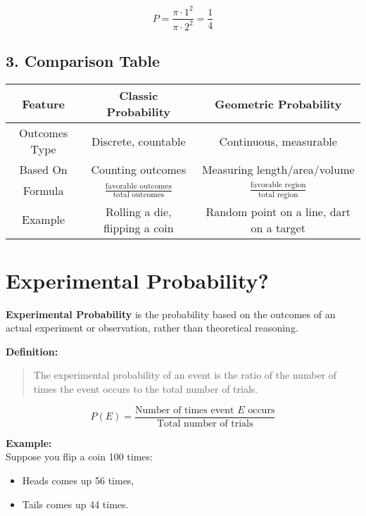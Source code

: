 \documentclass{article}
\begin{document}
\[
P = \frac{\pi \cdot 1^2}{\pi \cdot 2^2} = \frac{1}{4}
\]

\subsection*{3. Comparison Table}

\begin{center}
\begin{tabular}{|c|c|c|}
\hline

\textbf{Feature} & \textbf{Classic Probability} & \textbf{Geometric Probability} \\
\hline
Outcomes Type & Discrete, countable & Continuous, measurable \\
\hline
Based On & Counting outcomes & Measuring length/area/volume \\
\hline
Formula & \( \frac{\text{favorable outcomes}}{\text{total outcomes}} \) & \( \frac{\text{favorable region}}{\text{total region}} \) \\
\hline
Example & Rolling a die, flipping a coin & Random point on a line, dart on a target \\
\hline
\end{tabular}
\end{center}

\section {Experimental Probability?}

\textbf{Experimental Probability} is the probability based on the outcomes of an actual experiment or observation, rather than theoretical reasoning.

\bigskip

\noindent
\textbf{Definition:}

\begin{quote}
The experimental probability of an event is the ratio of the number of times the event occurs to the total number of trials.
\end{quote}

\[
P(E) = \frac{\text{Number of times event } E \text{ occurs}}{\text{Total number of trials}}
\]

\bigskip

\noindent
\textbf{Example:} \\
Suppose you flip a coin 100 times:
\begin{itemize}
    \item Heads comes up 56 times,
    \item Tails comes up 44 times.
\end{itemize}
\end{document}
